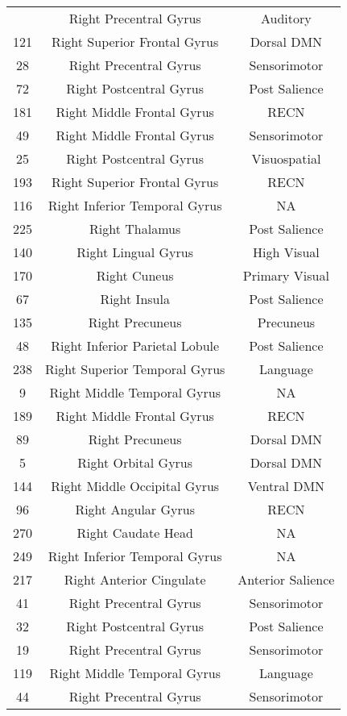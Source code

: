 \documentclass[10pt,letterpaper]{article}\usepackage[]{graphicx}\usepackage[]{color}
\begin{document}
\begin{center}
\begin{longtable}[c]{ccc}
		\bottomrule
		\endlastfoot
		71 & Right Precentral Gyrus & Auditory \\
		121	& Right Superior Frontal Gyrus & Dorsal DMN \\
		28 & Right Precentral Gyrus	& Sensorimotor \\
		72 & Right Postcentral Gyrus & Post Salience \\
		181	& Right Middle Frontal Gyrus & RECN \\
		49 & Right Middle Frontal Gyrus	& Sensorimotor \\
		25 & Right Postcentral Gyrus & Visuospatial \\
		193	& Right Superior Frontal Gyrus	& RECN \\
		116	& Right Inferior Temporal Gyrus	& NA \\
		225	& Right Thalamus & Post Salience \\
		140	& Right Lingual Gyrus & High Visual \\
		170	& Right Cuneus & Primary Visual \\
		67 & Right Insula & Post Salience \\
		135	& Right Precuneus & Precuneus \\
		48 & Right Inferior Parietal Lobule	& Post Salience \\
		238	& Right Superior Temporal Gyrus	& Language \\
		9 & Right Middle Temporal Gyrus	& NA \\
		189	& Right Middle Frontal Gyrus & RECN \\
		89 & Right Precuneus & Dorsal DMN \\
		5 & Right Orbital Gyrus	& Dorsal DMN \\
		144	& Right Middle Occipital Gyrus & Ventral DMN \\
		96 & Right Angular Gyrus & RECN \\
		270	& Right Caudate Head & NA \\
		249	& Right Inferior Temporal Gyrus	& NA \\
		217	& Right Anterior Cingulate & Anterior Salience \\
		41 & Right Precentral Gyrus	& Sensorimotor \\
		32 & Right Postcentral Gyrus & Post Salience \\
		19 & Right Precentral Gyrus	& Sensorimotor \\
		119	& Right Middle Temporal Gyrus & Language \\
		44 & Right Precentral Gyrus	& Sensorimotor \\

\end{longtable}
\end{center}
\end{document}

